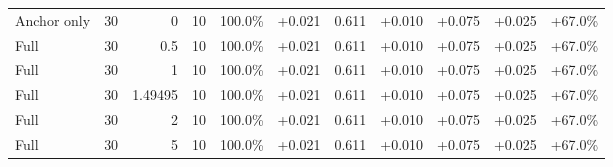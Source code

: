 \begin{table}[htbp]
\begin{tabular}{lrrrccccccc}
Anchor only & 30 & 0 & 10 & 100.0\% & +0.021 & 0.611 & +0.010 & +0.075 & +0.025 & +67.0\% \\
Full & 30 & 0.5 & 10 & 100.0\% & +0.021 & 0.611 & +0.010 & +0.075 & +0.025 & +67.0\% \\
Full & 30 & 1 & 10 & 100.0\% & +0.021 & 0.611 & +0.010 & +0.075 & +0.025 & +67.0\% \\
Full & 30 & 1.49495 & 10 & 100.0\% & +0.021 & 0.611 & +0.010 & +0.075 & +0.025 & +67.0\% \\
Full & 30 & 2 & 10 & 100.0\% & +0.021 & 0.611 & +0.010 & +0.075 & +0.025 & +67.0\% \\
Full & 30 & 5 & 10 & 100.0\% & +0.021 & 0.611 & +0.010 & +0.075 & +0.025 & +67.0\% \\
\bottomrule
\end{tabular}
\end{table}